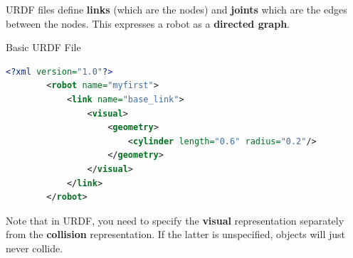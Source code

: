 URDF files define \textbf{links} (which are the nodes) and \textbf{joints} which are the edges between the nodes. This expresses a robot as a \textbf{directed graph}.

\begin{listing}
    \label{lis:URDF}
    \caption{Basic URDF File}
    \begin{lstlisting}[language=xml]
    <?xml version="1.0"?>
        <robot name="myfirst">
            <link name="base_link">
                <visual>
                    <geometry>
                        <cylinder length="0.6" radius="0.2"/>
                    </geometry>
                </visual>
            </link>
        </robot>\end{lstlisting}\end{listing}

Note that in URDF, you need to specify the \textbf{visual} representation separately from the \textbf{collision} representation. If the latter is unspecified, objects will just never collide.




